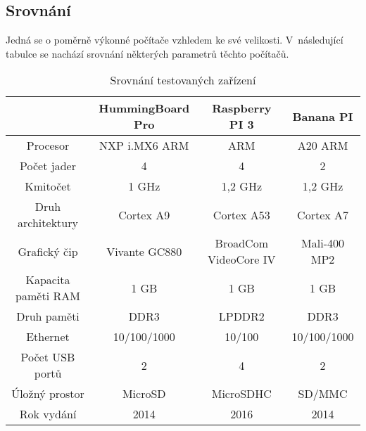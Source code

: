 \subsection{Srovnání}
Jedná se o poměrně výkonné počítače vzhledem ke své velikosti. V~následující tabulce se nachází srovnání některých parametrů těchto počítačů.
\begin{table}[H]
\centering
\caption{Srovnání testovaných zařízení}
\begin{tabular} { |c|c|c|c| }
\hline
{}                  & {HummingBoard Pro}    & {Raspberry PI 3}      & {Banana PI}          \\ \hline
Procesor            & NXP i.MX6 ARM         & ARM                   & A20 ARM              \\ \hline
Počet jader         & 4                     & 4                     & 2                    \\ \hline
Kmitočet            & 1 GHz                 & 1,2 GHz               & 1,2 GHz              \\ \hline
Druh architektury   & Cortex A9             & Cortex A53            & Cortex A7            \\ \hline
Grafický čip        & Vivante GC880         & BroadCom VideoCore IV & Mali-400 MP2         \\ \hline
Kapacita paměti RAM & 1 GB                  & 1 GB                  & 1 GB                 \\ \hline
Druh paměti         & DDR3                  & LPDDR2                & DDR3                 \\ \hline
Ethernet            & 10/100/1000           & 10/100                & 10/100/1000          \\ \hline
Počet USB portů     & 2                     & 4                     & 2                    \\ \hline
Úložný prostor      & MicroSD               & MicroSDHC             & SD/MMC               \\ \hline
Rok vydání          & 2014                  & 2016                  & 2014                 \\ \hline
\end{tabular}
\label{srovnaniPC}
\end{table}
